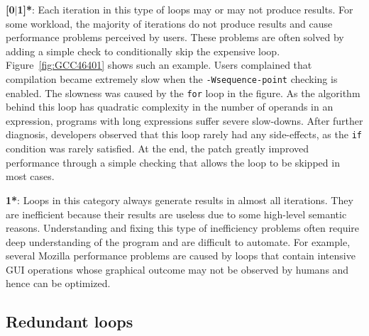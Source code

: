 {\textbf{[0$|$1]*}}:
Each iteration in this type of loops may or may not produce results.
For some workload, the majority of iterations do not produce
results and cause performance problems perceived by users.
These problems are often solved
by adding a simple check to conditionally skip the expensive loop.
Figure~\ref{fig:GCC46401} shows such an example.
Users complained that compilation became extremely slow when
the \texttt{-Wsequence-point} checking is enabled.
The slowness was caused
by the \texttt{for} loop in the figure. As the algorithm
behind this loop has quadratic complexity in the number of operands in an expression, 
programs with long expressions suffer severe slow-downs.
After further diagnosis, developers observed that this loop rarely
had any side-effects, as the \texttt{if} condition was rarely satisfied.
At the end, the patch greatly improved performance through a
simple checking that allows the loop to be
skipped in most cases.

\comment{
\textcolor{red}{ 
For example, a long expression inside the bug-triggering input exposes the super-linear 
inefficiency of checking violation of sequence point rule for GCC\#46401. 
Each operand on the expression will be compared with all previous operands on the same expression.
When fixing the bug,
developers notice that each operand on the buggy expression has a special feature which make the violation checking never 
report warning (generate results). 
The patch designed by developers is to add an extra condition checking to skip the violation checking for operands with that feature.    
}
}

{\textbf{1*}}:
Loops in this category always generate results in almost all iterations. 
They are inefficient because their results are useless due to
some high-level semantic reasons.
Understanding and fixing this type of inefficiency problems often require
deep understanding of the program and are difficult to automate.
For example, several Mozilla performance problems are caused by 
loops that contain intensive GUI operations whose graphical outcome may not
be observed by humans and hence can be optimized.

\subsection{Redundant loops}
\label{sec:study_redundant}

